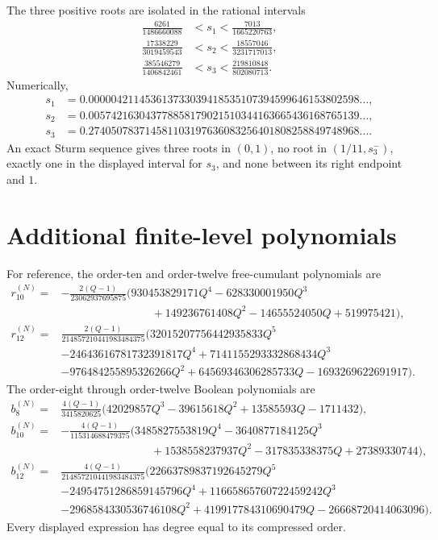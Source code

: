\documentclass[11pt]{article}
\theoremstyle{definition}
\begin{document}
The three positive roots are isolated in the rational intervals
\begin{align*}
\frac{6261}{1486660088}&<s_1<\frac{7013}{1665220763},\\
\frac{17338229}{3019459543}&<s_2<\frac{18557046}{3231717013},\\
\frac{385546279}{1406842461}&<s_3<\frac{219810848}{802080713}.
\end{align*}
Numerically,
\begin{align*}
s_1&=0.000004211453613733039418535107394599646153802598\ldots,\\
s_2&=0.005742163043778858179021510344163665436168765139\ldots,\\
s_3&=0.274050783714581103197636083256401808258849748968\ldots.
\end{align*}
An exact Sturm sequence gives three roots in \((0,1)\), no root in \((1/11,s_3^-)\), exactly one in the displayed interval for \(s_3\), and none between its right endpoint and \(1\).


\section{Additional finite-level polynomials}
For reference, the order-ten and order-twelve free-cumulant polynomials are
{\small
\begin{align*}
r_{10}^{(N)}={}&-\frac{2(Q-1)}{23062937695875}
\bigl(930453829171Q^4-628330001950Q^3\\
&\hspace{8em}+149236761408Q^2-14655524050Q+519975421\bigr),\\
r_{12}^{(N)}={}&\frac{2(Q-1)}{214857210441983484375}
\bigl(32015207756442935833Q^5\\
&-24643616781732391817Q^4+7141155293332868434Q^3\\
&-976484255895326266Q^2+64569346306285733Q-1693269622691917\bigr).
\end{align*}}
The order-eight through order-twelve Boolean polynomials are
{\small
\begin{align*}
b_8^{(N)}={}&\frac{4(Q-1)}{3415820625}
\bigl(42029857Q^3-39615618Q^2+13585593Q-1711432\bigr),\\
b_{10}^{(N)}={}&-\frac{4(Q-1)}{115314688479375}
\bigl(3485827553819Q^4-3640877184125Q^3\\
&\hspace{8em}+1538558237937Q^2-317835338375Q+27389330744\bigr),\\
b_{12}^{(N)}={}&\frac{4(Q-1)}{214857210441983484375}
\bigl(22663789837192645279Q^5\\
&-24954751286859145796Q^4+11665865760722459242Q^3\\
&-2968584330536746108Q^2+419917784310690479Q-26668720414063096\bigr).
\end{align*}}
Every displayed expression has degree equal to its compressed order.
\end{document}
